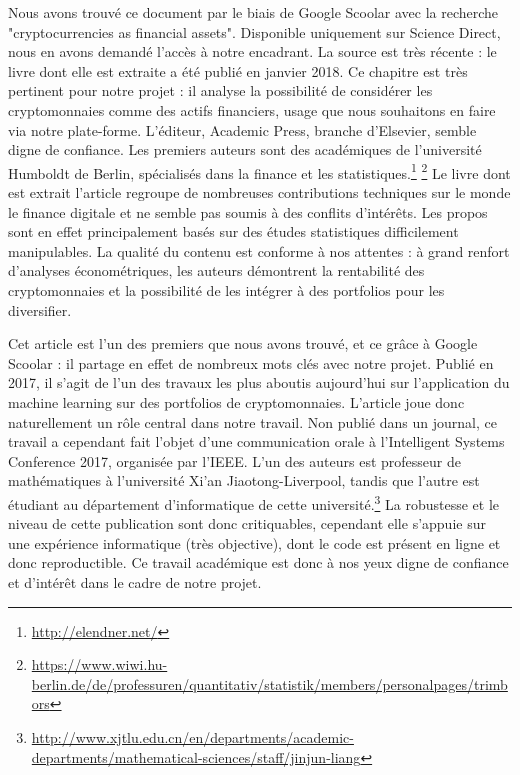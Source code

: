 \documentclass[a4paper]{article}
\begin{document}
Nous avons trouvé ce document par le biais de Google Scoolar avec la recherche "cryptocurrencies as financial assets". Disponible uniquement sur Science Direct, nous en avons demandé l'accès à notre encadrant. La source est très récente : le livre dont elle est extraite a été publié en janvier 2018. Ce chapitre est très pertinent pour notre projet : il analyse la possibilité de considérer les cryptomonnaies comme des actifs financiers, usage que nous souhaitons en faire via notre plate-forme. L'éditeur, Academic Press, branche d'Elsevier, semble digne de confiance. Les premiers auteurs sont des académiques de l'université Humboldt de Berlin, spécialisés dans la finance et les statistiques.\footnote{\url{http://elendner.net/}} \footnote{\url{https://www.wiwi.hu-berlin.de/de/professuren/quantitativ/statistik/members/personalpages/trimbors}}
Le livre dont est extrait l'article regroupe de nombreuses contributions techniques sur le monde le finance digitale et ne semble pas soumis à des conflits d'intérêts. Les propos sont en effet principalement basés sur des études statistiques difficilement manipulables. La qualité du contenu est conforme à nos attentes : à grand renfort d'analyses économétriques, les auteurs démontrent la rentabilité des cryptomonnaies et la possibilité de les intégrer à des portfolios pour les diversifier.

\textbf{}

Cet article est l'un des premiers que nous avons trouvé, et ce grâce à Google Scoolar : il partage en effet de nombreux mots clés avec notre projet. Publié en 2017, il s'agit de l'un des travaux les plus aboutis aujourd'hui sur l'application du machine learning sur des portfolios de cryptomonnaies. L'article joue donc naturellement un rôle central dans notre travail. Non publié dans un journal, ce travail a cependant fait l'objet d'une communication orale à l'Intelligent Systems Conference 2017, organisée par l'IEEE. L'un des auteurs est professeur de mathématiques à l'université Xi'an Jiaotong-Liverpool, tandis que l'autre est étudiant au département d'informatique de cette université.\footnote{\url{http://www.xjtlu.edu.cn/en/departments/academic-departments/mathematical-sciences/staff/jinjun-liang}}
La robustesse et le niveau de cette publication sont donc critiquables, cependant elle s'appuie sur une expérience informatique (très objective), dont le code est présent en ligne et donc reproductible. Ce travail académique est donc à nos yeux digne de confiance et d'intérêt dans le cadre de notre projet.
\end{document}
